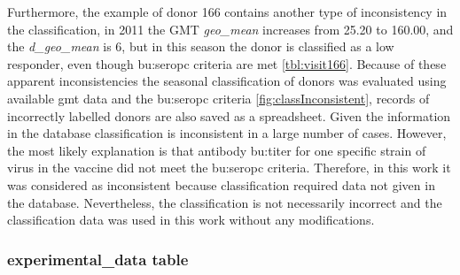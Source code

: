Furthermore, the example of donor 166 contains another type of inconsistency in the classification, in 2011 the GMT \textit{geo\_mean} increases from 25.20 to 160.00, and the \textit{d\_geo\_mean} is 6, but in this season the donor is classified as a low responder, even though \gls{bu:seropc} criteria are met \autoref{tbl:visit166}.
Because of these apparent inconsistencies the seasonal classification of donors was evaluated using available \acrshort{gmt} data and the \gls{bu:seropc} criteria \ref{fig:classInconsistent}, records of incorrectly labelled donors are also saved as a spreadsheet.
Given the information in the database classification is inconsistent in a large number of cases.
However, the most likely explanation is that antibody \gls{bu:titer} for one specific strain of virus in the vaccine did not meet the \gls{bu:seropc} criteria.
Therefore, in this work it was considered as inconsistent because classification required data not given in the database.
Nevertheless, the classification is not necessarily incorrect and the classification data was used in this work without any modifications.

\subsubsection{experimental\_data table}

